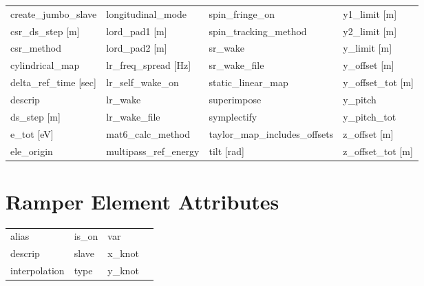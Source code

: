 \begin{tabular}{llll}
create_jumbo_slave               & longitudinal_mode                & spin_fringe_on                   & y1_limit [m]                     \\
csr_ds_step [m]                  & lord_pad1 [m]                    & spin_tracking_method             & y2_limit [m]                     \\
csr_method                       & lord_pad2 [m]                    & sr_wake                          & y_limit [m]                      \\
cylindrical_map                  & lr_freq_spread [Hz]              & sr_wake_file                     & y_offset [m]                     \\
delta_ref_time [sec]             & lr_self_wake_on                  & static_linear_map                & y_offset_tot [m]                 \\
descrip                          & lr_wake                          & superimpose                      & y_pitch                          \\
ds_step [m]                      & lr_wake_file                     & symplectify                      & y_pitch_tot                      \\
e_tot [eV]                       & mat6_calc_method                 & taylor_map_includes_offsets      & z_offset [m]                     \\
ele_origin                       & multipass_ref_energy             & tilt [rad]                       & z_offset_tot [m]                 \\
 \bottomrule
 \end{tabular}
 \vfill
 
 \section{Ramper Element Attributes}
 \label{s:list.ramper}
 
 \begin{tabular}{llll} \toprule
alias                            & is_on                            & var                              &                                  \\
descrip                          & slave                            & x_knot                           &                                  \\
interpolation                    & type                             & y_knot                           &                                  \\
 \bottomrule
 \end{tabular}
 \vfill
 
